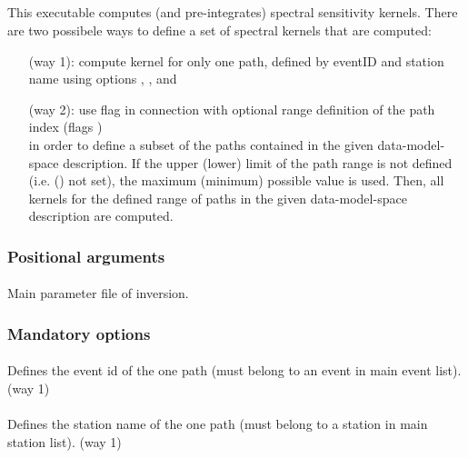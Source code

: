 \subsection{} \label{programs_scripts,sec:bin_prog,sec:com_kernel}
This executable computes (and pre-integrates) spectral sensitivity kernels. 
There are two possibele ways to define a set of spectral kernels that are computed:
\begin{itemize}
\item[(way 1):] compute kernel for only one path, defined by eventID and station name using options , ,  and 
\item[(way 2):] use flag  in connection with optional range definition of the path index (flags  )\\
in order to define a subset of the paths contained in the given data-model-space description. If the upper (lower) limit of the path range is not defined (i.e.  () not set), the maximum (minimum) possible value is used. Then, all kernels for the defined range of paths in the given data-model-space description are computed.
\end{itemize}
\subsubsection{Positional arguments}
\paragraph{}
Main parameter file of inversion.
\subsubsection{Mandatory options}
\paragraph{ } 
Defines the event id of the one path (must belong to an event in main event list). (way 1)
\paragraph{ }
Defines the station name of the one path (must belong to a station in main station list). (way 1)
